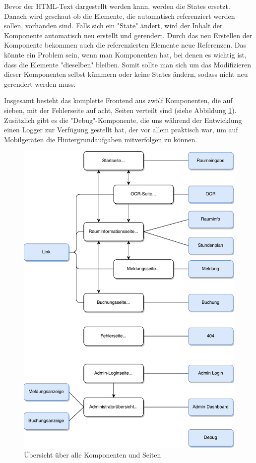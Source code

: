 Bevor der HTML-Text dargestellt werden kann, werden die States ersetzt. Danach wird geschaut ob die Elemente, die automatisch referenziert werden sollen, vorhanden sind. Falls sich ein "State" ändert, wird der Inhalt der Komponente automatisch neu erstellt und gerendert. Durch das neu Erstellen der Komponente bekommen auch die referenzierten Elemente neue Referenzen. Das könnte ein Problem sein, wenn man Komponenten hat, bei denen es wichtig ist, dass die Elemente "dieselben" bleiben. Somit sollte man sich um das Modifizieren dieser Komponenten selbst kümmern oder keine States ändern, sodass nicht neu gerendert werden muss.


Insgesamt besteht das komplette Frontend aus zwölf Komponenten, die auf sieben, mit der Fehlerseite auf acht, Seiten verteilt sind (siehe Abbildung \ref{fig:comppageoverview}). Zusätzlich gibt es die "Debug"-Komponente, die uns während der Entwicklung einen Logger zur Verfügung gestellt hat, der vor allem praktisch war, um auf Mobilgeräten die Hintergrundaufgaben mitverfolgen zu können.

\begin{figure}[H]
    \centering
    \includegraphics[width=150mm]{media/WebComponents/overview.svg.pdf} %
    \caption{Übersicht über alle Komponenten und Seiten}
    \label{fig:comppageoverview}
\end{figure}

